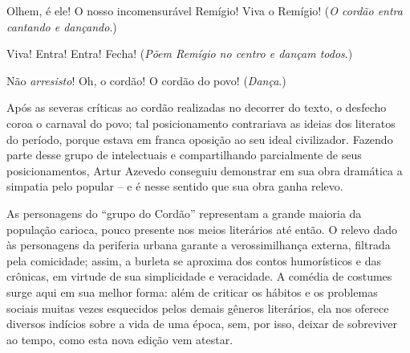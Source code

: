 \begin{hedraquote} 
 Olhem, é ele! O nosso incomensurável Remígio! Viva o
Remígio! (\textit{O cordão entra cantando e dançando}.)

 Viva! Entra! Entra! Fecha! (\textit{Põem Remígio no centro e
dançam todos}.)

 Não \textit{arresisto}! Oh, o cordão! O cordão do povo!
(\textit{Dança}.)
\end{hedraquote} 

Após as severas críticas ao cordão realizadas no decorrer do texto, o
desfecho coroa o carnaval do povo; tal posicionamento contrariava as
ideias dos literatos do período, porque estava em franca oposição ao
seu ideal civilizador. Fazendo parte desse grupo de intelectuais e
compartilhando parcialmente de seus posicionamentos, Artur Azevedo
conseguiu demonstrar em sua obra dramática a simpatia pelo popular -- e
é nesse sentido que sua obra ganha relevo. 

As personagens do “grupo do Cordão” representam a grande maioria da
população carioca, pouco presente nos meios literários até então. O
relevo dado às personagens da periferia urbana garante a
verossimilhança externa, filtrada pela comicidade; assim, a burleta se
aproxima dos contos humorísticos e das crônicas, em virtude de sua
simplicidade e veracidade. A comédia de costumes surge aqui em sua
melhor forma: além de criticar os hábitos e os problemas sociais muitas
vezes esquecidos pelos demais gêneros literários, ela nos oferece
diversos indícios sobre a vida de uma época, sem, por isso, deixar de
sobreviver ao tempo, como esta nova edição vem atestar.
